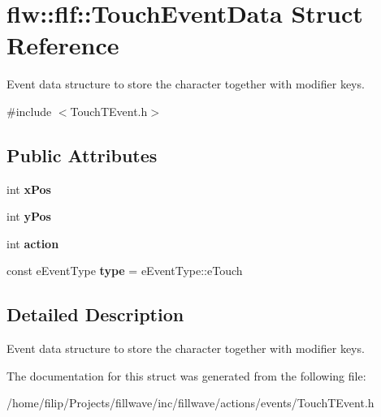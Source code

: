 \hypertarget{structflw_1_1flf_1_1TouchEventData}{}\section{flw\+:\+:flf\+:\+:Touch\+Event\+Data Struct Reference}
\label{structflw_1_1flf_1_1TouchEventData}


Event data structure to store the character together with modifier keys.  




{\ttfamily \#include $<$Touch\+T\+Event.\+h$>$}

\subsection*{Public Attributes}
\begin{DoxyCompactItemize}
\item 
int {\bfseries x\+Pos}\hypertarget{structflw_1_1flf_1_1TouchEventData_a358be6219f32e71f510144f4459cf2df}{}\label{structflw_1_1flf_1_1TouchEventData_a358be6219f32e71f510144f4459cf2df}

\item 
int {\bfseries y\+Pos}\hypertarget{structflw_1_1flf_1_1TouchEventData_a002aac325e6c7fa0e247d0760b457ed1}{}\label{structflw_1_1flf_1_1TouchEventData_a002aac325e6c7fa0e247d0760b457ed1}

\item 
int {\bfseries action}\hypertarget{structflw_1_1flf_1_1TouchEventData_a554f89c076f33304f762c2bae912d27d}{}\label{structflw_1_1flf_1_1TouchEventData_a554f89c076f33304f762c2bae912d27d}

\item 
const e\+Event\+Type {\bfseries type} = e\+Event\+Type\+::e\+Touch\hypertarget{structflw_1_1flf_1_1TouchEventData_a90d4ff7df4139424c11b7b33674993c6}{}\label{structflw_1_1flf_1_1TouchEventData_a90d4ff7df4139424c11b7b33674993c6}

\end{DoxyCompactItemize}


\subsection{Detailed Description}
Event data structure to store the character together with modifier keys. 

The documentation for this struct was generated from the following file\+:\begin{DoxyCompactItemize}
\item 
/home/filip/\+Projects/fillwave/inc/fillwave/actions/events/Touch\+T\+Event.\+h\end{DoxyCompactItemize}
